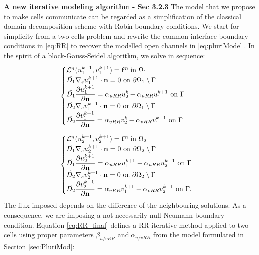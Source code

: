 \documentclass[a4paper]{siamonline220329}
\begin{document}
\textbf{A new iterative modeling algorithm - Sec 3.2.3 }
The model that we propose to make cells communicate can be regarded as a simplification of the classical domain decomposition scheme with Robin boundary conditions. We start for simplicity from a two cells problem and rewrite the common interface boundary conditions in \eqref{eq:RR} to recover the modelled open channels in \eqref{eq:pluriModel}. In the spirit of a block-Gauss-Seidel algorithm, we solve in sequence:
\begin{equation} \label{eq:RR_final}
\begin{aligned}
& \begin{cases}
\mathcal{L}^n (u_1^{k+1}, v_1^{k+1}) = \mathbf{f}^n \ \text{in} \ \Omega_1 \\
\Tilde{D_1} \nabla_s u_1^{k+1} \cdot \mathbf{n} = 0 \ \text{on} \ \partial \Omega_1 \setminus \Gamma \\
\Tilde{D_1} \displaystyle{\partial u_1^{k+1}\over\partial \mathbf{n}} = \alpha_{uRR} u_2^{k} - \alpha_{uRR} u_1^{k+1} \ \text{on} \ \Gamma \\
\Tilde{D_2} \nabla_s v_1^{k+1} \cdot \mathbf{n} = 0 \ \text{on} \ \partial \Omega_1 \setminus \Gamma \\
\Tilde{D_2} \displaystyle{\partial v_1^{k+1}\over\partial \mathbf{n}} = \alpha_{vRR} v_2^{k} -\alpha_{vRR} v_1^{k+1} \ \text{on} \ \Gamma
\end{cases}
\\[6pt]
& \begin{cases}
\mathcal{L}^n (u_2^{k+1}, v_2^{k+1}) = \mathbf{f}^n \ \text{in} \ \Omega_2 \\
\Tilde{D_1} \nabla_s u_2^{k+1} \cdot \mathbf{n} = 0 \ \text{on} \ \partial \Omega_2 \setminus \Gamma \\
\Tilde{D_1} \displaystyle{\partial u_2^{k+1}\over\partial \mathbf{n}} = \alpha_{uRR} u_1^{k+1} - \alpha_{uRR} u_2^{k+1} \ \text{on} \ \Gamma \\
\Tilde{D_2} \nabla_s v_2^{k+1} \cdot \mathbf{n} = 0 \ \text{on} \ \partial \Omega_2 \setminus \Gamma\\
\Tilde{D_2} \displaystyle{\partial v_2^{k+1}\over\partial \mathbf{n}} = \alpha_{vRR} v_1^{k+1} -\alpha_{vRR} v_2^{k+1} \ \text{on} \ \Gamma.
\end{cases}
\end{aligned}\end{equation}
The flux imposed depends on the difference of the neighbouring solutions. As a consequence, we are imposing a not necessarily null Neumann boundary condition. Equation \eqref{eq:RR_final} defines a RR iterative method applied to two cells using proper parameters $\beta_{u/vRR}$ and $\alpha_{u/v RR}$ from the model formulated in Section \ref{sec:PluriMod}:
\end{document}
